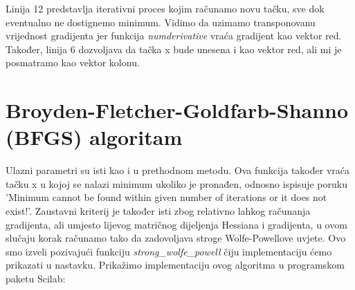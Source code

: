 \documentclass[bosnian,12pt,a4paper]{report}
\begin{document}
\vspace*{0.5cm}


\justify
Linija 12 predstavlja iterativni proces kojim računamo novu tačku, sve dok eventualno ne dostignemo minimum. Vidimo da uzimamo transponovanu vrijednost gradijenta jer funkcija \textit{numderivative} vraća gradijent kao vektor red. Također, linija 6 dozvoljava da tačka x bude unesena i kao vektor red, ali mi je posmatramo kao vektor kolonu.


\newpage



\section{Broyden-Fletcher-Goldfarb-Shanno (BFGS) algoritam}

\justify
Ulazni parametri su isti kao i u prethodnom metodu. Ova funkcija također vraća tačku x u kojoj se nalazi minimum ukoliko je pronađen, odnosno ispisuje poruku 'Minimum cannot be found within given number of iterations or it does not exist!'. Zaustavni kriterij je također isti zbog relativno lahkog računanja gradijenta, ali umjesto lijevog matričnog dijeljenja Hessiana i gradijenta, u ovom slučaju korak računamo tako da zadovoljava stroge Wolfe-Powellove uvjete. Ovo smo izveli pozivajući funkciju \textit{strong_wolfe_powell} čiju implementaciju ćemo prikazati u nastavku. Prikažimo implementaciju ovog algoritma u programskom paketu Scilab:\\

\vspace*{0.5cm}
\end{document}
